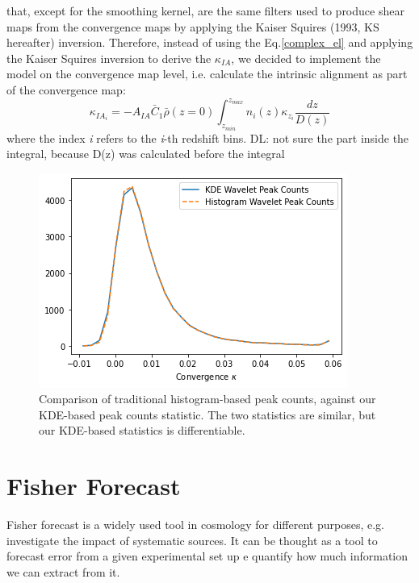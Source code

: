 \documentclass[twocolumn,twocolappendix]{aastex63}
\newcommand{\denise}[1]{{\color{red}DL: #1}}
\begin{document}
that, except for the smoothing kernel, 
are the same filters used to produce shear maps from the convergence maps by applying the Kaiser  Squires (1993, KS hereafter) inversion.
Therefore, instead of using the Eq.\ref{complex_el} and applying the Kaiser Squires inversion to derive the $\kappa_{IA}$, 
we decided to implement the model on the convergence map level, i.e. calculate the intrinsic alignment as part of the convergence map: 
\begin{equation}
    \kappa_{IA_{i}}= 
    - A_{IA}\bar{C}_1\bar{\rho}(z=0)
    \int_{z_{min}}^{z_{max}} 
    n_{i}(z) \kappa_{z_{i}}
    \frac{ dz}{D(z)}
\end{equation}
where the index \textit{i} refers to the \textit{i}-th redshift bins.
\denise{not sure the part inside the integral, because D(z) was calculated before the integral}



\begin{figure}
    \centering
    \includegraphics[width=\columnwidth]{figures/peakcounts.png}
    \caption{Comparison of traditional histogram-based peak counts, against our  KDE-based peak counts statistic. The two statistics are similar, but our KDE-based statistics is differentiable.}
    \label{fig:comp_statistics}
\end{figure}

\section{Fisher Forecast}
Fisher forecast is a widely used tool in cosmology for different purposes, e.g. investigate the impact of systematic sources. It can be thought as a tool to forecast error from a given experimental set up e quantify how much information we can extract from it. 
\end{document}
